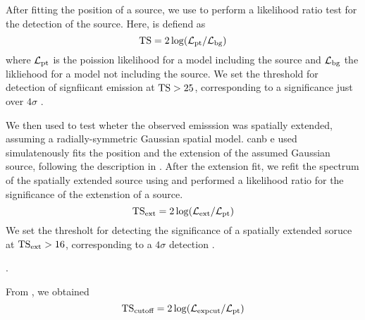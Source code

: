 
After fitting the position of a source, we use \gtlike to perform a likelihood ratio test for
the detection of the source. Here, \ts is defiend as
\begin{equation}
  \text{TS} = 2 \log(\mathcal{L}_\text{pt}/\mathcal{L}_\text{bg})
\end{equation}
where $\mathcal{L}_\text{pt}$ is the poission likelihood for a model including the source and $\mathcal{L}_\text{bg}$
the likliehood for a model not including the source.
We set the threshold for detection of signfiicant emission at $\text{TS}>25$, 
corresponding to a significance just over $4\sigma$ \citep{LAT_Collaboration_1FGL_2010}.

We then used \pointlike to test wheter the observed emisssion was spatially extended, assuming
a radially-symmetric Gaussian spatial model. 
\pointlike canb e used simulatenously fits the position and the extension of the assumed Gaussian source, following
the description in \citep{LAT_collaboration_extended_search_2012}. 
After the extension fit, we refit the spectrum of the spatially extended source using \gtlike
and performed a likelihood ratio for the significance of the extenstion of a source.
\begin{equation}
  \text{TS}_\text{ext} = 2 \log(\mathcal{L}_\text{ext}/\mathcal{L}_\text{pt})
\end{equation}
We set the thresholt for detecting the significance of a spatially extended
soruce at $\text{TS}_\text{ext}>16$, corresponding to a $4\sigma$ detection \citep{LAT_collaboration_extended_search_2012}. 


\citep{LAT_collaboration_extended_search_2012}. 


From \gtlike, we obtained  
\begin{equation}
  \text{TS}_\text{cutoff}= 2 \log(\mathcal{L}_\text{expcut}/\mathcal{L}_\text{pt})
\end{equation}

